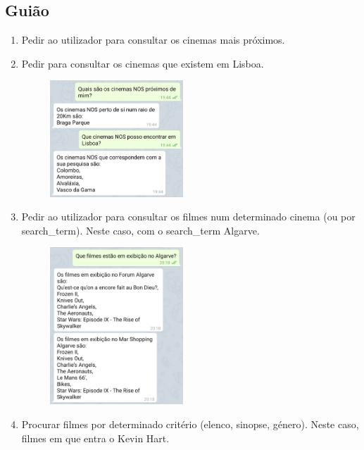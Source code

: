 \documentclass[11pt, a4paper]{article}
\begin{document}
\begin{appendices}
\subsection{Guião}
\begin{enumerate}
    \item Pedir ao utilizador para consultar os cinemas mais próximos.
    \item Pedir para consultar os cinemas que existem em Lisboa.
    \begin{figure}[H]
        \centering
        \includegraphics[width=5cm]{images/guiaoP/2.png}
    \end{figure}
    \item Pedir ao utilizador para consultar os filmes num determinado cinema (ou por search\_term). Neste caso, com o search\_term Algarve.
    \begin{figure}[H]
        \centering
        \includegraphics[width=5cm]{images/guiaoP/3.png}
    \end{figure}
    \item Procurar filmes por determinado critério (elenco, sinopse, género). Neste caso, filmes em que entra o Kevin Hart.
    \begin{figure}[H]
        \centering

\end{figure}
\end{enumerate}
\end{appendices}
\end{document}
